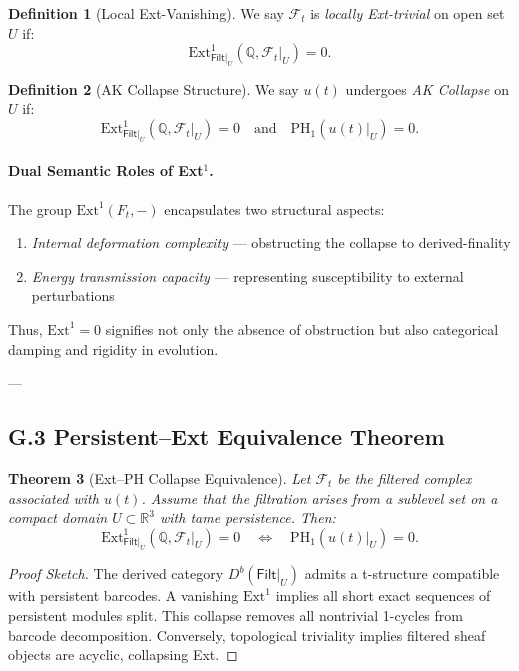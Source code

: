\documentclass[11pt]{article}
\newtheorem{theorem}{Theorem}[section]
\theoremstyle{definition}
\newtheorem{definition}[theorem]{Definition}
\begin{document}
\begin{definition}[Local Ext-Vanishing]
We say $\mathcal{F}_t$ is \emph{locally Ext-trivial} on open set $U$ if:
\[
\mathrm{Ext}^1_{\mathsf{Filt}|_U}(\mathbb{Q}, \mathcal{F}_t|_U) = 0.
\]
\end{definition}

\begin{definition}[AK Collapse Structure]
We say $u(t)$ undergoes \emph{AK Collapse} on $U$ if:
\[
\mathrm{Ext}^1_{\mathsf{Filt}|_U}(\mathbb{Q}, \mathcal{F}_t|_U) = 0 \quad \text{and} \quad \mathrm{PH}_1(u(t)|_U) = 0.
\]
\end{definition}

\paragraph{Dual Semantic Roles of Ext$^1$.}
The group $\mathrm{Ext}^1(F_t, -)$ encapsulates two structural aspects:
\begin{enumerate}
    \item \emph{Internal deformation complexity} — obstructing the collapse to derived-finality
    \item \emph{Energy transmission capacity} — representing susceptibility to external perturbations
\end{enumerate}
Thus, $\mathrm{Ext}^1 = 0$ signifies not only the absence of obstruction but also categorical damping and rigidity in evolution.

---

\subsection*{G.3 Persistent–Ext Equivalence Theorem}

\begin{theorem}[Ext–PH Collapse Equivalence]
Let $\mathcal{F}_t$ be the filtered complex associated with $u(t)$.  
Assume that the filtration arises from a sublevel set on a compact domain $U \subset \mathbb{R}^3$ with tame persistence.  
Then:
\[
\mathrm{Ext}^1_{\mathsf{Filt}|_U}(\mathbb{Q}, \mathcal{F}_t|_U) = 0 \quad \Longleftrightarrow \quad \mathrm{PH}_1(u(t)|_U) = 0.
\]
\end{theorem}

\begin{proof}[Proof Sketch]
The derived category $D^b(\mathsf{Filt}|_U)$ admits a t-structure compatible with persistent barcodes.  
A vanishing $\mathrm{Ext}^1$ implies all short exact sequences of persistent modules split.  
This collapse removes all nontrivial 1-cycles from barcode decomposition.  
Conversely, topological triviality implies filtered sheaf objects are acyclic, collapsing Ext.
\end{proof}
\end{document}
